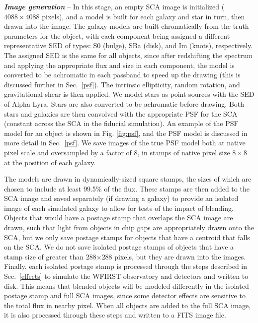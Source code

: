 \documentclass[usenatbib]{mnras}
\begin{document}
\textbf{\textit{Image generation}} -- In this stage, an empty SCA image is initialized ($4088\times4088$ pixels), and a model is built for each galaxy and star in turn, then drawn into the image. 
The galaxy models are built chromatically from the truth parameters for the object, with each component being assigned a different representative SED of types: S0 (bulge), SBa (disk), and Im (knots), respectively. 
The assigned SED is the same for all objects, since after redshifting the spectrum and applying the appropriate flux and size in each component, the model is converted to be achromatic in each passband to speed up the drawing (this is discussed further in Sec.~\ref{psf}). 
The intrinsic ellipticity, random rotation, and gravitational shear is then applied.
We model stars as point sources with the SED of Alpha Lyra.
Stars are also converted to be achromatic before drawing.
Both stars and galaxies are then convolved with the appropriate PSF for the SCA (constant across the SCA in the fiducial simulation). An example of the PSF model for an object is shown in Fig. \ref{fig:psf}, and the PSF model is discussed in more detail in Sec.~\ref{psf}. We save images of the true PSF model both at native pixel scale and oversampled by a factor of 8, in stamps of native pixel size $8\times 8$ at the position of each galaxy.

The models are drawn in dynamically-sized square stamps, the sizes of which are chosen to include at least 99.5\% of the flux.
These stamps are then added to the SCA image and saved separately (if drawing a galaxy) to provide an isolated image of each simulated galaxy to allow for tests of the impact of blending.
Objects that would have a postage stamp that overlaps the SCA image are drawn, such that light from objects in chip gaps are appropriately drawn onto the SCA, but we only save postage stamps for objects that have a centroid that falls on the SCA. 
We do not save isolated postage stamps of objects that have a stamp size of greater than 288$\times$288 pixels, but they are drawn into the images.
Finally, each isolated postage stamp is processed through the steps described in Sec.~\ref{effects} to simulate the WFIRST observatory and detectors and written to disk. This means that blended objects will be modeled differently in the isolated postage stamp and full SCA images, since some detector effects are sensitive to the total flux in nearby pixel. When all objects are added to the full SCA image, it is also processed through these steps and written to a FITS image file.
\end{document}

